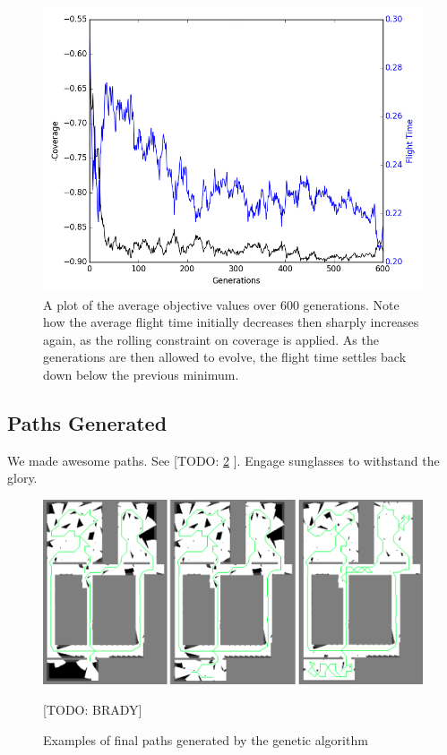 \documentclass[letterpaper, 10 pt, conference]{ieeeconf}  %
\newcommand{\todo}[1]{{\color{blue}[TODO: #1]}}
\begin{document}
\begin{figure}
\centering
\includegraphics[width=0.8\linewidth]{figures/fitness.png}
\caption{A plot of the average objective values over 600 generations. Note how the average flight time initially decreases then sharply increases again, as the rolling constraint on coverage is applied. As the generations are then allowed to evolve, the flight time settles back down below the previous minimum.}
\label{fig:objectives}
\end{figure}

\subsection{Paths Generated}

We made awesome paths. See \todo{ \ref{fig:final_paths} }. Engage sunglasses to withstand the glory.

\begin{figure}
\centering
\includegraphics[width=1.0\linewidth]{figures/final_paths.png}
\caption{Examples of final paths generated by the genetic algorithm}
\label{fig:final_paths}

\todo{BRADY}

\end{figure}
\end{document}
